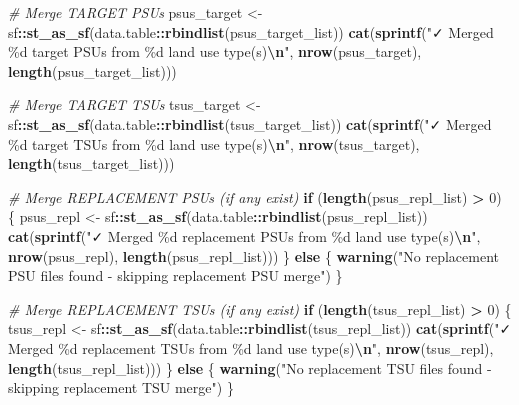 \documentclass[
  10pt,
  b5paper,
  oneside]{book}
\newenvironment{Shaded}{\begin{snugshade}}{\end{snugshade}}
\newcommand{\CommentTok}[1]{\textcolor[rgb]{0.56,0.35,0.01}{\textit{#1}}}
\newcommand{\ControlFlowTok}[1]{\textcolor[rgb]{0.13,0.29,0.53}{\textbf{#1}}}
\newcommand{\DecValTok}[1]{\textcolor[rgb]{0.00,0.00,0.81}{#1}}
\newcommand{\FunctionTok}[1]{\textcolor[rgb]{0.13,0.29,0.53}{\textbf{#1}}}
\newcommand{\NormalTok}[1]{#1}
\newcommand{\OtherTok}[1]{\textcolor[rgb]{0.56,0.35,0.01}{#1}}
\newcommand{\SpecialCharTok}[1]{\textcolor[rgb]{0.81,0.36,0.00}{\textbf{#1}}}
\newcommand{\StringTok}[1]{\textcolor[rgb]{0.31,0.60,0.02}{#1}}
\begin{document}
\begin{Shaded}
\begin{Highlighting}[]
\CommentTok{\# Merge TARGET PSUs}
\NormalTok{psus\_target }\OtherTok{\textless{}{-}}\NormalTok{ sf}\SpecialCharTok{::}\FunctionTok{st\_as\_sf}\NormalTok{(data.table}\SpecialCharTok{::}\FunctionTok{rbindlist}\NormalTok{(psus\_target\_list))}
\FunctionTok{cat}\NormalTok{(}\FunctionTok{sprintf}\NormalTok{(}\StringTok{"✓ Merged \%d target PSUs from \%d land use type(s)}\SpecialCharTok{\textbackslash{}n}\StringTok{"}\NormalTok{, }
            \FunctionTok{nrow}\NormalTok{(psus\_target), }\FunctionTok{length}\NormalTok{(psus\_target\_list)))}

\CommentTok{\# Merge TARGET TSUs}
\NormalTok{tsus\_target }\OtherTok{\textless{}{-}}\NormalTok{ sf}\SpecialCharTok{::}\FunctionTok{st\_as\_sf}\NormalTok{(data.table}\SpecialCharTok{::}\FunctionTok{rbindlist}\NormalTok{(tsus\_target\_list))}
\FunctionTok{cat}\NormalTok{(}\FunctionTok{sprintf}\NormalTok{(}\StringTok{"✓ Merged \%d target TSUs from \%d land use type(s)}\SpecialCharTok{\textbackslash{}n}\StringTok{"}\NormalTok{, }
            \FunctionTok{nrow}\NormalTok{(tsus\_target), }\FunctionTok{length}\NormalTok{(tsus\_target\_list)))}

\CommentTok{\# Merge REPLACEMENT PSUs (if any exist)}
\ControlFlowTok{if}\NormalTok{ (}\FunctionTok{length}\NormalTok{(psus\_repl\_list) }\SpecialCharTok{\textgreater{}} \DecValTok{0}\NormalTok{) \{}
\NormalTok{  psus\_repl }\OtherTok{\textless{}{-}}\NormalTok{ sf}\SpecialCharTok{::}\FunctionTok{st\_as\_sf}\NormalTok{(data.table}\SpecialCharTok{::}\FunctionTok{rbindlist}\NormalTok{(psus\_repl\_list))}
  \FunctionTok{cat}\NormalTok{(}\FunctionTok{sprintf}\NormalTok{(}\StringTok{"✓ Merged \%d replacement PSUs from \%d land use type(s)}\SpecialCharTok{\textbackslash{}n}\StringTok{"}\NormalTok{, }
              \FunctionTok{nrow}\NormalTok{(psus\_repl), }\FunctionTok{length}\NormalTok{(psus\_repl\_list)))}
\NormalTok{\} }\ControlFlowTok{else}\NormalTok{ \{}
  \FunctionTok{warning}\NormalTok{(}\StringTok{"No replacement PSU files found {-} skipping replacement PSU merge"}\NormalTok{)}
\NormalTok{\}}

\CommentTok{\# Merge REPLACEMENT TSUs (if any exist)}
\ControlFlowTok{if}\NormalTok{ (}\FunctionTok{length}\NormalTok{(tsus\_repl\_list) }\SpecialCharTok{\textgreater{}} \DecValTok{0}\NormalTok{) \{}
\NormalTok{  tsus\_repl }\OtherTok{\textless{}{-}}\NormalTok{ sf}\SpecialCharTok{::}\FunctionTok{st\_as\_sf}\NormalTok{(data.table}\SpecialCharTok{::}\FunctionTok{rbindlist}\NormalTok{(tsus\_repl\_list))}
  \FunctionTok{cat}\NormalTok{(}\FunctionTok{sprintf}\NormalTok{(}\StringTok{"✓ Merged \%d replacement TSUs from \%d land use type(s)}\SpecialCharTok{\textbackslash{}n}\StringTok{"}\NormalTok{, }
              \FunctionTok{nrow}\NormalTok{(tsus\_repl), }\FunctionTok{length}\NormalTok{(tsus\_repl\_list)))}
\NormalTok{\} }\ControlFlowTok{else}\NormalTok{ \{}
  \FunctionTok{warning}\NormalTok{(}\StringTok{"No replacement TSU files found {-} skipping replacement TSU merge"}\NormalTok{)}
\NormalTok{\}}


\end{Highlighting}
\end{Shaded}
\end{document}
